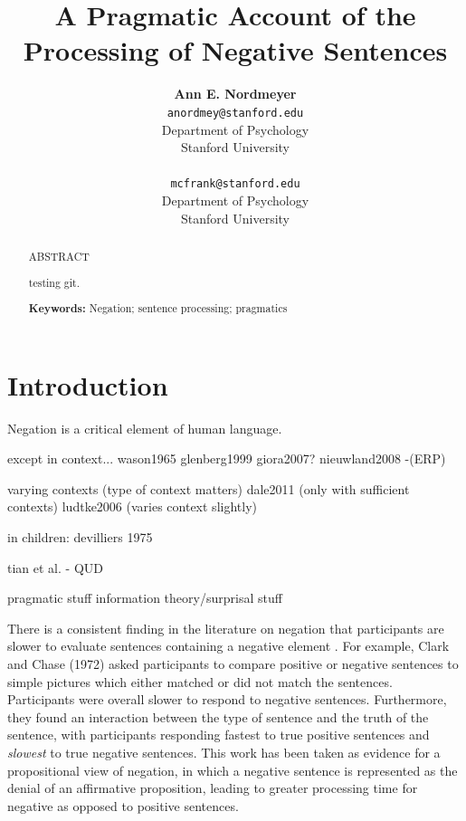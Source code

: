 \documentclass[10pt,letterpaper]{article}
\title{A Pragmatic Account of the Processing of Negative Sentences}
\author{{\large \bf Ann E. Nordmeyer} \\ \texttt{anordmey@stanford.edu}\\ Department of Psychology \\ Stanford University \\ 
\And {\large \bf Michael C. Frank} \\ \texttt{mcfrank@stanford.edu} \\ Department of Psychology \\ Stanford University \\ }
\begin{document}
\maketitle

\begin{abstract}

ABSTRACT

testing git.  

\textbf{Keywords:} 
Negation; sentence processing; pragmatics
\end{abstract}

\section{Introduction}

Negation is a critical element of human language.  

except in context...
wason1965
glenberg1999
giora2007?
nieuwland2008 -(ERP)

varying contexts (type of context matters)
dale2011 (only with sufficient contexts)
ludtke2006 (varies context slightly)


in children:
devilliers 1975

tian et al. - QUD

pragmatic stuff
information theory/surprisal stuff





There is a consistent finding in the literature on negation that participants are slower to evaluate sentences containing a negative element  \cite{hclark1972, carpenter1975, just1971, just1976}.  For example, Clark and Chase (1972) asked participants to compare positive or negative sentences to simple pictures which either matched or did not match the sentences.  Participants were overall slower to respond to negative sentences.  Furthermore, they found an interaction between the type of sentence and the truth of the sentence, with participants responding fastest to true positive sentences and \emph{slowest} to true negative sentences.  This work has been taken as evidence for a propositional view of negation, in which a negative sentence is represented as the denial of an affirmative proposition, leading to greater processing time for negative as opposed to positive sentences. 
\end{document}
